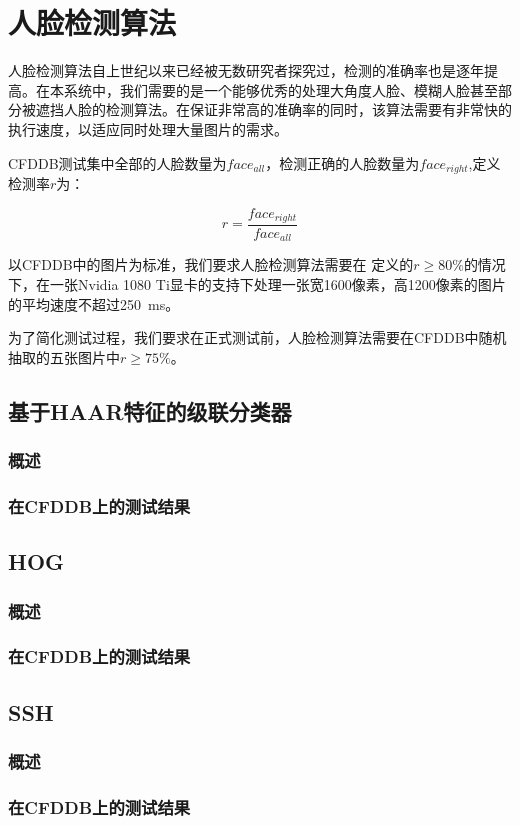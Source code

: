 \chapter{人脸检测算法}
\label{chap:facedetection}

人脸检测算法自上世纪以来已经被无数研究者探究过，检测的准确率也是逐年提高。在本系统中，我们需要的是一个能够优秀的处理大角度人脸、模糊人脸甚至部分被遮挡人脸的检测算法。在保证非常高的准确率的同时，该算法需要有非常快的执行速度，以适应同时处理大量图片的需求。

CFDDB测试集中全部的人脸数量为$face_{all}$，检测正确的人脸数量为$face_{right}$,定义检测率$r$为：

\begin{displaymath}
\label{eq:rdef}
	r = \frac{face_{right}}{face_{all}} 
\end{displaymath}

以CFDDB中的图片为标准，我们要求人脸检测算法需要在 定义的$r\geq 80\%$的情况下，在一张Nvidia 1080 Ti显卡的支持下处理一张宽1600像素，高1200像素的图片的平均速度不超过\SI{250}{ms}。

为了简化测试过程，我们要求在正式测试前，人脸检测算法需要在CFDDB中随机抽取的五张图片中$r\geq 75\%$。


\section{基于HAAR特征的级联分类器}

\subsection{概述}



\subsection{在CFDDB上的测试结果}


\section{HOG}

\subsection{概述}

\subsection{在CFDDB上的测试结果}


\section{SSH}

\subsection{概述}

\subsection{在CFDDB上的测试结果}

